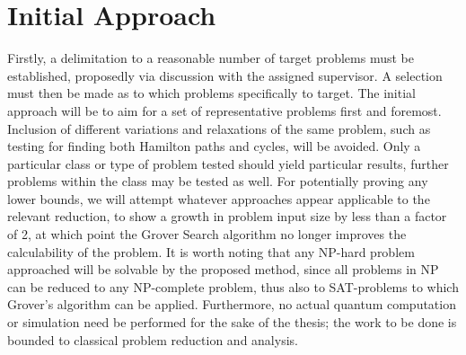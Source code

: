 \documentclass[msc,lith,english]{liuthesis}
\begin{document}
\section{Initial Approach}
Firstly, a delimitation to a reasonable number of target problems must be established, proposedly via discussion with the assigned supervisor. A selection must then be made as to which problems specifically to target. The initial approach will be to aim for a set of representative problems first and foremost. Inclusion of different variations and relaxations of the same problem, such as testing for finding both Hamilton paths and cycles, will be avoided. Only a particular class or type of problem tested should yield particular results, further problems within the class may be tested as well. For potentially proving any lower bounds, we will attempt whatever approaches appear applicable to the relevant reduction, to show a growth in problem input size by less than a factor of 2, at which point the Grover Search algorithm no longer improves the calculability of the problem. It is worth noting that any NP-hard problem approached will be solvable by the proposed method, since all problems in NP can be reduced to any NP-complete problem, thus also to SAT-problems to which Grover’s algorithm can be applied. Furthermore, no actual quantum computation or simulation need be performed for the sake of the thesis; the work to be done is bounded to classical problem reduction and analysis.

\printbibliography
\end{document}
